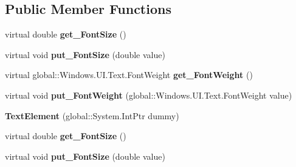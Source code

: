 \subsection*{Public Member Functions}
\begin{DoxyCompactItemize}
\item 
\mbox{\label{class_windows_1_1_u_i_1_1_xaml_1_1_documents_1_1_text_element_a464e66349927c2d04603990a3ff81720}} 
virtual double {\bfseries get\+\_\+\+Font\+Size} ()
\item 
\mbox{\label{class_windows_1_1_u_i_1_1_xaml_1_1_documents_1_1_text_element_a95e88b90730bfefe38cd0f13d9f4555e}} 
virtual void {\bfseries put\+\_\+\+Font\+Size} (double value)
\item 
\mbox{\label{class_windows_1_1_u_i_1_1_xaml_1_1_documents_1_1_text_element_ac494f42bd84cb16612ea34a6a6e9a6f0}} 
virtual global\+::\+Windows.\+U\+I.\+Text.\+Font\+Weight {\bfseries get\+\_\+\+Font\+Weight} ()
\item 
\mbox{\label{class_windows_1_1_u_i_1_1_xaml_1_1_documents_1_1_text_element_ad99e56ff2f90ee72234321c2ba23b1e5}} 
virtual void {\bfseries put\+\_\+\+Font\+Weight} (global\+::\+Windows.\+U\+I.\+Text.\+Font\+Weight value)
\item 
\mbox{\label{class_windows_1_1_u_i_1_1_xaml_1_1_documents_1_1_text_element_a434a1629decb82d8f5a91fbca43cac71}} 
{\bfseries Text\+Element} (global\+::\+System.\+Int\+Ptr dummy)
\item 
\mbox{\label{class_windows_1_1_u_i_1_1_xaml_1_1_documents_1_1_text_element_a464e66349927c2d04603990a3ff81720}} 
virtual double {\bfseries get\+\_\+\+Font\+Size} ()
\item 
\mbox{\label{class_windows_1_1_u_i_1_1_xaml_1_1_documents_1_1_text_element_a95e88b90730bfefe38cd0f13d9f4555e}} 
virtual void {\bfseries put\+\_\+\+Font\+Size} (double value)

\end{DoxyCompactItemize}
